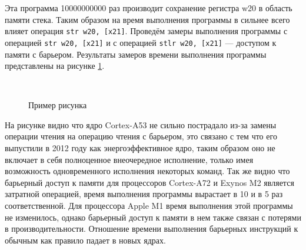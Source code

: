 
Эта программа 10000000000 раз производит сохранение регистра w20 в область памяти стека. Таким образом на время выполнения программы в сильнее всего влияет операция \texttt{str w20, [x21]}. Проведём замеры выполнения программы с операцией \texttt{str w20, [x21]} и с операцией \texttt{stlr w20, [x21]} --- доступом к памяти с барьером. Результаты замеров времени выполнения программы представлены на рисунке \ref{fig:speed}.

\begin{figure}[hbtp]
	\centering
	\\
	\caption{Пример рисунка}
	\label{fig:speed}
\end{figure}

На рисунке видно что ядро Cortex-A53 не сильно пострадало из-за замены операции чтения на операцию чтения с барьером, это связано с тем что его выпустили в 2012 году как энергоэффективное ядро, таким образом оно не включает в себя полноценное внеочередное исполнение, только имея возможность одновременного исполнения некоторых команд. Так же видно что барьерный доступ к памяти для процессоров Cortex-A72 и Exynos M2 является затратной операцией, время выполнения программы вырастает в 10 и в 5 раз соответственной. Для процессора Apple M1 время выполнения этой программы не изменилось, однако барьерный доступ к памяти в нем также связан с потерями в производительности. Отношение времени выполнения барьерных инструкций к обычным как правило падает в новых ядрах.

